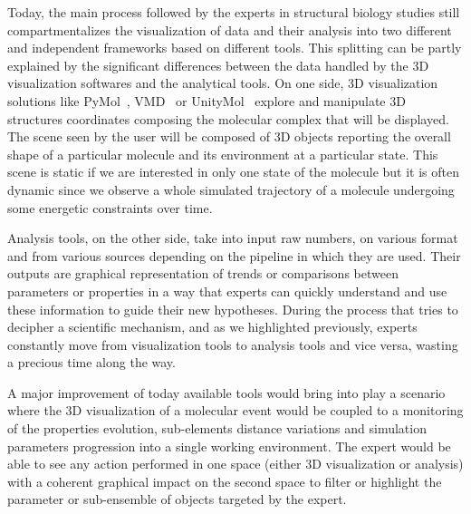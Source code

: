 \documentclass{vgtc}                          %
\begin{document}
Today, the main process followed by the experts in structural biology studies still compartmentalizes the visualization of data and their analysis into two different and independent frameworks based on different tools.
This splitting can be partly explained by the significant differences between the data handled by the 3D visualization softwares and the analytical tools.
On one side, 3D visualization solutions like PyMol~\cite{delano_pymol_2002}, VMD~\cite{humphrey_vmd:_1996} or UnityMol~\cite{lv2013game} explore and manipulate 3D structures coordinates composing the molecular complex that will be displayed. The scene seen by the user will be composed of 3D objects reporting the overall shape of a particular molecule and its environment at a particular state. This scene is static if we are interested in only one state of the molecule but it is often dynamic since we observe a whole simulated trajectory of a molecule undergoing some energetic constraints over time.

Analysis tools, on the other side, take into input raw numbers, on various format and from various sources depending on the pipeline in which they are used. Their outputs are graphical representation of trends or comparisons between parameters or properties in a way that experts can quickly understand and use these information to guide their new hypotheses.
During the process that tries to decipher a scientific mechanism, and as we highlighted previously, experts constantly move from visualization tools to analysis tools and vice versa, wasting a precious time along the way.

A major improvement of today available tools would bring into play a scenario where the 3D visualization of a molecular event would be coupled to a monitoring of the properties evolution, sub-elements distance variations and simulation parameters progression into a single working environment. The expert would be able to see any action performed in one space (either 3D visualization or analysis) with a coherent graphical impact on the second space to filter or highlight the parameter or sub-ensemble of objects targeted by the expert.
\end{document}
